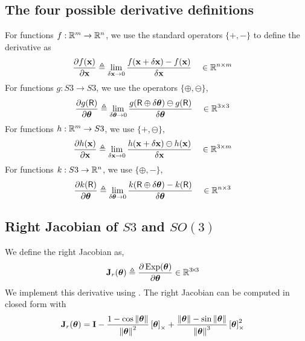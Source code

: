 \subsection{The four possible derivative definitions}

For functions $f:{\mathbb R}^m\to{\mathbb R}^n$, we use the standard operators $\{+,-\}$ to define the derivative as
%
\begin{align}
\frac{\partial f({\bf x})}{\partial{\bf x}} &\triangleq \lim_{\delta{\bf x}\to0}\frac{f({\bf x}+\delta{\bf x})-f({\bf x})}{\delta{\bf x}} &&\in {\mathbb R}^{n\times m} \label{equ:derivative_vector}
\end{align}
%
For functions $g:S3\to S3$, we use the operators $\{\oplus,\ominus\}$,
%
\begin{align}
\frac{\partial g(\mathsf R)}{\partial{{\bm \theta}}} 
&\triangleq \lim_{\delta{{\bm \theta}}\to0}\frac{g(\mathsf R\oplus\delta{{\bm \theta}})\ominus g(\mathsf R)}{\delta{{\bm \theta}}}  && \in {\mathbb R}^{3\times 3}
\label{equ:derivative_SO3}
\end{align}
%
For functions $h:{\mathbb R}^m \to S3$, we use $\{+,\ominus\}$,
%
\begin{align}
\frac{\partial h({\bf x})}{\partial{\bf x}} &\triangleq \lim_{\delta{\bf x}\to0} \frac{ h({\bf x}+\delta{\bf x})\ominus h({\bf x})}{\delta{\bf x}} && \in {\mathbb R}^{3\times m} \label{equ:dif_RtoSO3}
\end{align}
%
For functions $k:S3\to{\mathbb R}^n$, we use $\{\oplus,-\}$,
%
\begin{align}
\frac{\partial k(\mathsf R)}{\partial{{\bm \theta}}} &\triangleq \lim_{\delta{{\bm \theta}}\to0} \frac{k(\mathsf R\oplus\delta{{\bm \theta}}) - k(\mathsf R)}{\delta{{\bm \theta}}} && \in {\mathbb R}^{n\times 3} \label{equ:jacobian_SO3_Rn}
\end{align}


\subsection{Right Jacobian of $S3$ and $SO(3)$}

We define the right Jacobian as, 
%
\begin{align}\label{equ:Jr}
{\bf J}_r({{\bm \theta}}) &\triangleq \frac{\partial\operatorname*{Exp}({{\bm \theta}})}{\partial{{\bm \theta}}} 
\in{\mathbb R}^{3\!\times\!3}
\end{align}
%
We implement this derivative using .
The right Jacobian can be computed in closed form  \cite[pag.~40]{CHIRIKJIAN-12} with
%
\begin{align}
{\bf J}_r({{\bm \theta}}) &= {\bf I} - \frac{1-\cos{\left\|{{\bm \theta}}\right\|}}{{\left\|{{\bm \theta}}\right\|}^2}\left[{{\bm \theta}}\right]_\times + \frac{{\left\|{{\bm \theta}}\right\|}-\sin{\left\|{{\bm \theta}}\right\|}}{{\left\|{{\bm \theta}}\right\|}^3}\left[{{\bm \theta}}\right]_\times^2 
\end{align}



